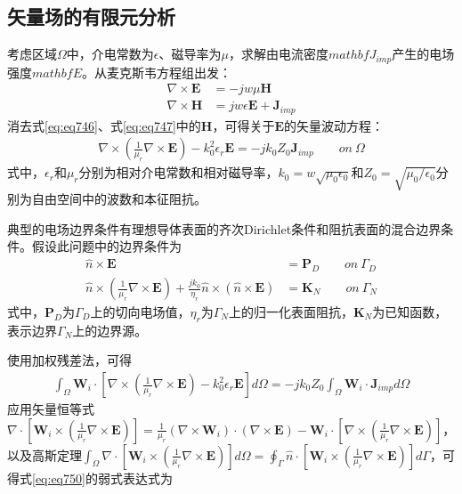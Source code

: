 \documentclass{article}
\numberwithin{equation}{section}
\begin{document}
\subsection{矢量场的有限元分析}
考虑区域$\Omega$中，介电常数为$\epsilon$、磁导率为$\mu$，求解由电流密度$mathbf{J}_{imp}$产生的电场强度$mathbf{E}$。从麦克斯韦方程组出发：
\begin{align}
    \label{eq:eq746}
    \nabla \times \mathbf{E}&=-jw\mu\mathbf{H} \\
    \label{eq:eq747}
    \nabla \times \mathbf{H}&=jw\epsilon\mathbf{E}+\mathbf{J}_{imp}
\end{align}
消去式\ref{eq:eq746}、式\ref{eq:eq747}中的$\mathbf{H}$，可得关于$\mathbf{E}$的矢量波动方程：
\begin{align}
    \label{eq:eq750}
    \nabla\times\left(\frac{1}{\mu_r}\nabla\times\mathbf{E}\right)-k_0^2\epsilon_r\mathbf{E}=-jk_0Z_0\mathbf{J}_{imp} \qquad on~\Omega
\end{align}
式中，$\epsilon_r$和$\mu_r$分别为相对介电常数和相对磁导率，$k_0=w\sqrt{\mu_0\epsilon_0}$和$Z_0=\sqrt{\mu_0/\epsilon_0}$分别为自由空间中的波数和本征阻抗。\par
典型的电场边界条件有理想导体表面的齐次Dirichlet条件和阻抗表面的混合边界条件。假设此问题中的边界条件为
\begin{align}
    \label{eq:eq751}
    \hat{n}\times\mathbf{E}&=\mathbf{P}_D \qquad on~\Gamma_D \\
    \label{eq:eq752}
    \hat{n}\times\left(\frac{1}{\mu_r}\nabla\times\mathbf{E}\right)+\frac{jk_0}{\eta_r}\hat{n}\times\left(\hat{n}\times\mathbf{E}\right)&=\mathbf{K}_N \qquad on~\Gamma_N
\end{align}
式中，$\mathbf{P}_D$为$\Gamma_D$上的切向电场值，$\eta_r$为$\Gamma_N$上的归一化表面阻抗，$\mathbf{K}_N$为已知函数，表示边界$\Gamma_N$上的边界源。\par
使用加权残差法，可得
\begin{align}
    \label{eq:eq753}
    \int_{\Omega}\mathbf{W}_i\cdot\left[\nabla\times\left(\frac{1}{\mu_r}\nabla\times\mathbf{E}\right)-k_0^2\epsilon_r\mathbf{E}\right]d\Omega=-jk_0Z_0\int_{\Omega}\mathbf{W}_i\cdot\mathbf{J}_{imp}d\Omega
\end{align}
应用矢量恒等式$\nabla\cdot\left[\mathbf{W}_i\times\left(\frac{1}{\mu_r}\nabla\times\mathbf{E}\right)\right]=\frac{1}{\mu_r}\left(\nabla\times\mathbf{W}_i\right)\cdot\left(\nabla\times\mathbf{E}\right)-\mathbf{W}_i\cdot\left[\nabla\times\left(\frac{1}{\mu_r}\nabla\times\mathbf{E}\right)\right]$，以及高斯定理$\int_{\Omega}\nabla\cdot\left[\mathbf{W}_i\times\left(\frac{1}{\mu_r}\nabla\times\mathbf{E}\right)\right]d\Omega=\oint_{\Gamma}\hat{n}\cdot\left[\mathbf{W}_i\times\left(\frac{1}{\mu_r}\nabla\times\mathbf{E}\right)\right]d\Gamma$，可得式\ref{eq:eq750}的弱式表达式为
\end{document}
